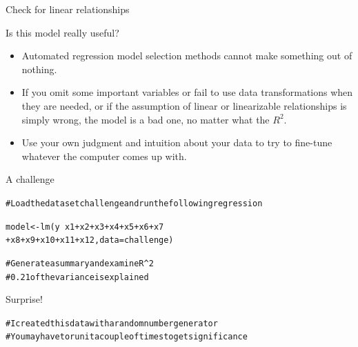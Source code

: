 \documentclass{beamer}\usepackage[]{graphicx}\usepackage[]{color}
\makeatletter
\newcommand{\hlcom}[1]{\textcolor[rgb]{0.824,0.706,0.549}{#1}}%
\newcommand{\hlopt}[1]{\textcolor[rgb]{1,0.894,0.769}{#1}}%
\newcommand{\hlstd}[1]{\textcolor[rgb]{1,0.894,0.769}{#1}}%
\newcommand{\hlkwb}[1]{\textcolor[rgb]{0.804,0.776,0.451}{#1}}%
\newcommand{\hlkwc}[1]{\textcolor[rgb]{0.78,0.941,0.545}{#1}}%
\newcommand{\hlkwd}[1]{\textcolor[rgb]{1,0.78,0.769}{#1}}%
\newenvironment{kframe}{%
 \def\at@end@of@kframe{}%
 \ifinner\ifhmode%
  \def\at@end@of@kframe{\end{minipage}}%
  \begin{minipage}{\columnwidth}%
 \fi\fi%
 \def\FrameCommand##1{\hskip\@totalleftmargin \hskip-\fboxsep
 \colorbox{shadecolor}{##1}\hskip-\fboxsep
     \hskip-\linewidth \hskip-\@totalleftmargin \hskip\columnwidth}%
 \MakeFramed {\advance\hsize-\width
   \@totalleftmargin\z@ \linewidth\hsize
   \@setminipage}}%
 {\par\unskip\endMakeFramed%
 \at@end@of@kframe}
\newenvironment{knitrout}{}{} %
\makeatother
\begin{document}
\begin{darkframes}
\begin{frame}[fragile]{Check for linear relationships}
    \end{frame}


    \begin{frame}[fragile]{Is this model really useful?}
      \begin{itemize}[<+->]
        \item Automated regression model selection methods cannot make something out of nothing. 
        \item If you omit some important variables or fail to use data transformations when they are needed, or if the assumption of linear or linearizable relationships is simply wrong, the model is a bad one, no matter what the $R^2$.  
        \item Use your own judgment and intuition about your data to try to fine-tune whatever the computer comes up with.

        \end{itemize} 
    \end{frame}


    \begin{frame}[fragile]{A challenge}
    \fontsize{8}{8}\selectfont  

\begin{knitrout}
\begin{kframe}
\begin{alltt}
\hlcom{# Load the dataset challenge and run the following regression}

\hlstd{model} \hlkwb{<-} \hlkwd{lm}\hlstd{(y} \hlopt{~} \hlstd{x1} \hlopt{+} \hlstd{x2} \hlopt{+} \hlstd{x3} \hlopt{+} \hlstd{x4} \hlopt{+} \hlstd{x5} \hlopt{+} \hlstd{x6} \hlopt{+} \hlstd{x7}
     \hlopt{+} \hlstd{x8} \hlopt{+} \hlstd{x9} \hlopt{+} \hlstd{x10} \hlopt{+} \hlstd{x11} \hlopt{+} \hlstd{x12,} \hlkwc{data}\hlstd{=challenge)}

    \hlcom{# Generate a summary and examine R^2}
    \hlcom{# 0.21 of the variance is explained    }
\end{alltt}
\end{kframe}
\end{knitrout}

    \end{frame}


    \begin{frame}[fragile]{Surprise!}
    \fontsize{8}{8}\selectfont  

\begin{knitrout}
\begin{kframe}
\begin{alltt}
\hlcom{# I created this data with a random number generator}
\hlcom{# You may have to run it a couple of times to get significance}


\end{alltt}
\end{kframe}
\end{knitrout}
\end{frame}
\end{darkframes}
\end{document}
